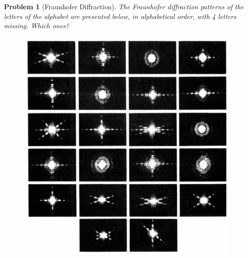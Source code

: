 \documentclass[a4paper]{article}
\theoremstyle{new}
\newtheorem{qns}{Problem}[section]
\begin{document}
\begin{qns}[Fraunhofer Diffraction]
The Fraunhofer diffraction patterns of the letters of the alphabet are presented below, in alphabetical order, with 4 letters missing. Which ones?
\begin{figure}[H]
    \centering
    \includegraphics[width=\linewidth]{2_25.PNG}
\end{figure}
\end{qns}
\end{document}
